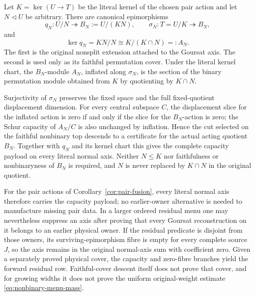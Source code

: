 \begin{remark}
Let $K=\ker(U\to T)$ be the literal kernel of the chosen pair action and
let $N\lhd U$ be arbitrary. There are canonical epimorphisms
\[
 q_N:U/N\twoheadrightarrow B_N:=U/(KN),\qquad
 \sigma_N:T=U/K\twoheadrightarrow B_N,
\]
and
\[
 \ker q_N=KN/N\cong K/(K\cap N)=:A_N.
\]
The first is the original nonsplit extension attached to the Goursat axis.
The second is used only as its faithful permutation cover. Under the
literal kernel chart, the $B_N$-module $A_N$, inflated along $\sigma_N$,
is the section of the binary permutation module obtained from $K$ by
quotienting by $K\cap N$.

Surjectivity of $\sigma_N$ preserves the fixed space and the full
fixed-quotient displacement dimension. For every central subspace $C$,
the displacement slice for the inflated action is zero if and only if the
slice for the $B_N$-action is zero; the Schur capacity of $A_N/C$ is also
unchanged by inflation. Hence the cut selected on the faithful nonbinary
top descends to a certificate for the actual acting quotient $B_N$.
Together with $q_N$ and its kernel chart this gives the complete capacity
payload on every literal normal axis. Neither $N\leq K$ nor faithfulness
or nonbinaryness of $B_N$ is required, and $N$ is never replaced by
$K\cap N$ in the original quotient.

For the pair actions of Corollary~\ref{cor:pair-fusion}, every literal
normal axis therefore carries the capacity payload; no earlier-owner
alternative is needed to manufacture missing pair data. In a larger
ordered residual menu one may nevertheless suppress an axis after proving
that every Goursat reconstruction on it belongs to an earlier physical
owner. If the residual predicate is disjoint from those owners, its
surviving-epimorphism fibre is empty for every complete source $J$, so the
axis remains in the original normal-axis sum with coefficient zero. Given
a separately proved physical cover, the capacity and zero-fibre branches
yield the forward residual row. Faithful-cover descent itself does not prove
that cover, and for growing widths it does not prove the uniform
original-weight estimate \eqref{eq:nonbinary-menu-mass}.
\end{remark}

